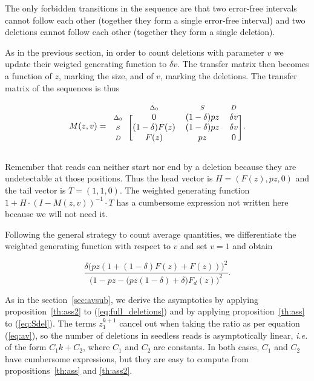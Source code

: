 \documentclass{article}
\newcommand{\smD}{\scriptstyle{D}}
\newcommand{\smS}{\scriptstyle{S}}
\newcommand{\smDELz}{\scriptstyle{\Delta_0}}
\begin{document}
The only forbidden transitions in the sequence are that two error-free
intervals cannot follow each other (together they form a single error-free
interval) and two deletions cannot follow each other (together they form a
single deletion).

As in the previous section, in order to count deletions with parameter $v$
we update their weigted generating function to $\delta v$. The transfer
matrix then becomes a function of $z$, marking the size, and of $v$,
marking the deletions. The transfer matrix of the sequences is thus


\begin{equation*}
M(z,v) = 
\begin{blockarray}{cccc}
       & \smDELz & \smS & \smD \\
\begin{block}{c[ccc]}
\smDELz & 0              & (1-\delta)pz & \delta v \\
\smS    & (1-\delta)F(z) & (1-\delta)pz & \delta v \\
\smD    & F(z)           & pz           & 0        \\
\end{block}
\end{blockarray}.
\end{equation*}

Remember that reads can neither start nor end by a deletion because they
are undetectable at those positions. Thus the head vector is $H = (F(z),
pz, 0)$ and the tail vector is $T = (1,1,0)$. The weighted generating
function $1+H \cdot (I-M(z,v))^{-1} \cdot T$ has a cumbersome expression
not written here because we will not need it.

Following the general strategy to count average quantities, we
differentiate the weighted generating function with respect to $v$ and
set $v=1$ and obtain

\begin{equation}
\label{eq:full_deletions}
\frac{\delta\big( pz(1+(1-\delta)F(z)+F(z)) \big)^2}
{\big( 1-pz - \big(pz(1-\delta) + \delta\big)F_d(z) \big)^2}.
\end{equation}

As in the section~\ref{sec:avsub}, we derive the asymptotics by applying
proposition~\ref{th:ass2} to (\ref{eq:full_deletions}) and by applying
proposition~\ref{th:ass} to (\ref{eq:Sdel}). The terms $z_1^{k+1}$ cancel
out when taking the ratio as per equation (\ref{eq:av}), so the number of
deletions in seedless reads is asymptotically linear, \textit{i.e.} of the
form $C_1k+C_2$, where $C_1$ and $C_2$ are constants. In both cases, $C_1$
and $C_2$ have cumbersome expressions, but they are easy to compute from
propositions~\ref{th:ass} and \ref{th:ass2}.
\end{document}
